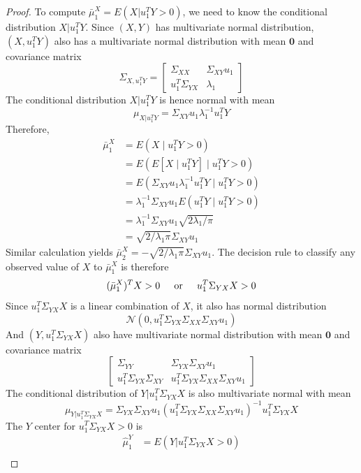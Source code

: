 \documentclass[12pt]{article}
\begin{document}
\begin{proof}
To compute $\bar{\mu}^X_1 = E(X|u^T_1 Y>0)$, we need to know the conditional distribution $X|u^T_1 Y$. Since $(X,Y)$ has multivariate normal distribution, $(X,u^T_1 Y)$ also has a multivariate normal distribution with mean $\mathbf{0}$ and covariance matrix
$$\Sigma_{X,u^T_1 Y}=\begin{bmatrix} \Sigma_{XX} & \Sigma_{XY} u_1 \\  u^T_1 \Sigma_{YX} & \lambda_1 \end{bmatrix}$$
The conditional distribution $X|u^T_1 Y$ is hence normal with mean
 $$\mu_{X|u^T_1 Y} = \Sigma_{XY} u_1 \lambda^{-1}_1 u^T_1 Y $$
Therefore, 
\begin{align}
\bar{\mu}^X_1 &= E(X \mid u^T_1 Y>0) \nonumber \\ \nonumber
 			  &= E\left(E[X \mid u^T_1 Y] \mid u^T_1 Y>0\right) \\ \nonumber
 			  &=  E\left(\Sigma_{XY} u_1 \lambda^{-1}_1 u^T_1 Y \mid u^T_1 Y>0\right)\\ \nonumber
 			  &= \lambda^{-1}_1 \Sigma_{XY}u_1 E(u^T_1 Y \mid u^T_1 Y>0) \\ \nonumber
 			  &= \lambda^{-1}_1 \Sigma_{XY}u_1 \sqrt{2 \lambda_1/\pi} \\ \nonumber
 			  &= \sqrt{2 / \lambda_1 \pi} \Sigma_{XY}u_1
\end{align}
Similar calculation yields $\bar{\mu}^X_2 = -\sqrt{2 / \lambda_1 \pi} \Sigma_{XY}u_1$.
The decision rule to classify any observed value of $X$ to $\bar{\mu}^X_1$ is therefore
\[	(\bar{\mu}^X_1)^T X >0	\hspace{0.2in}\text{or} \hspace{0.2in} u^T_1\Sigma_{YX}X>0\] 
Since $u^T_1\Sigma_{YX}X$ is a linear combination of $X$, it also has normal distribution 
\[	\mathcal{N} \left( 0, u^T_1\Sigma_{YX} \Sigma_{XX} \Sigma_{XY} u_1\right)	\]
And $(Y,u^T_1\Sigma_{YX}X)$ also have multivariate normal distribution with mean $\mathbf{0}$ 
and covariance matrix
\[
\begin{bmatrix}
\Sigma_{YY} & \Sigma_{YX}\Sigma_{XY}u_1  \\
u^T_1\Sigma_{YX}\Sigma_{XY} &  u^T_1\Sigma_{YX} \Sigma_{XX} \Sigma_{XY} u_1
\end{bmatrix}
\]
The conditional distribution of $Y|u^T_1\Sigma_{YX}X$ is also multivariate normal with mean 
\[	
\mu_{Y|u^T_1\Sigma_{YX}X } = \Sigma_{YX}\Sigma_{XY}u_1 (u^T_1\Sigma_{YX} \Sigma_{XX} \Sigma_{XY} u_1)^{-1}u^T_1\Sigma_{YX}X	
\]
The $Y$ center for $u^T_1\Sigma_{YX}X>0$ is
\begin{align}
\hat{\mu}^Y_1 &= E(Y|u^T_1\Sigma_{YX}X>0) \nonumber \\ \nonumber

\end{align}
\end{proof}
\end{document}
